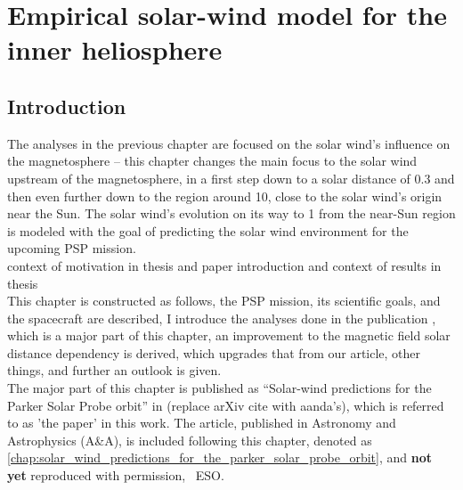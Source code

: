 
\chapter{Empirical solar-wind model for the inner heliosphere}
\label{chap:empirical_solar_wind_model_for_the_inner_heliosphere}

\section{Introduction}

The analyses in the previous chapter are focused on the solar wind's influence on the magnetosphere -- this chapter changes the main focus to the solar wind upstream of the magnetosphere, in a first step down to a solar distance of \SI{0.3}{\au} and then even further down to the region around \SI{10}{\Rs}, close to the solar wind's origin near the Sun. The solar wind's evolution on its way to \SI{1}{\au} from the near-Sun region is modeled with the goal of predicting the solar wind environment for the upcoming PSP mission.\\

context of motivation in thesis and paper introduction and context of results in thesis\\

This chapter is constructed as follows, the PSP mission, its scientific goals, and the spacecraft are described, I introduce the analyses done in the publication \citet{Venzmer2017}, which is a major part of this chapter, an improvement to the magnetic field solar distance dependency is derived, which upgrades that from our article, other things, and further an outlook is given.\\


The major part of this chapter is published as ``Solar-wind predictions for the Parker Solar Probe orbit'' in \citet{Venzmer2017} (replace arXiv cite with aanda's), which is referred to as 'the paper' in this work. The article, published in Astronomy and Astrophysics (A\&A), is included following this chapter, denoted as \autoref{chap:solar_wind_predictions_for_the_parker_solar_probe_orbit}, and \textbf{not yet} reproduced with permission, \textcopyright~ESO.

